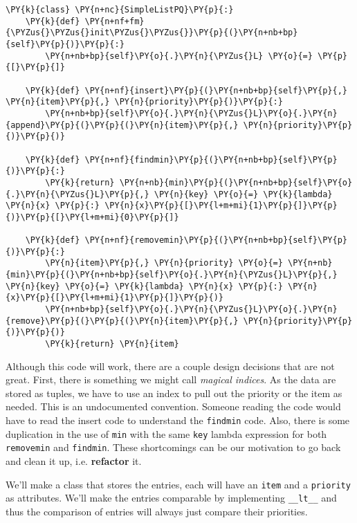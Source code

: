 \begin{Verbatim}[commandchars=\\\{\}]
\PY{k}{class} \PY{n+nc}{SimpleListPQ}\PY{p}{:}
    \PY{k}{def} \PY{n+nf+fm}{\PYZus{}\PYZus{}init\PYZus{}\PYZus{}}\PY{p}{(}\PY{n+nb+bp}{self}\PY{p}{)}\PY{p}{:}
        \PY{n+nb+bp}{self}\PY{o}{.}\PY{n}{\PYZus{}L} \PY{o}{=} \PY{p}{[}\PY{p}{]}

    \PY{k}{def} \PY{n+nf}{insert}\PY{p}{(}\PY{n+nb+bp}{self}\PY{p}{,} \PY{n}{item}\PY{p}{,} \PY{n}{priority}\PY{p}{)}\PY{p}{:}
        \PY{n+nb+bp}{self}\PY{o}{.}\PY{n}{\PYZus{}L}\PY{o}{.}\PY{n}{append}\PY{p}{(}\PY{p}{(}\PY{n}{item}\PY{p}{,} \PY{n}{priority}\PY{p}{)}\PY{p}{)}

    \PY{k}{def} \PY{n+nf}{findmin}\PY{p}{(}\PY{n+nb+bp}{self}\PY{p}{)}\PY{p}{:}
        \PY{k}{return} \PY{n+nb}{min}\PY{p}{(}\PY{n+nb+bp}{self}\PY{o}{.}\PY{n}{\PYZus{}L}\PY{p}{,} \PY{n}{key} \PY{o}{=} \PY{k}{lambda} \PY{n}{x} \PY{p}{:} \PY{n}{x}\PY{p}{[}\PY{l+m+mi}{1}\PY{p}{]}\PY{p}{)}\PY{p}{[}\PY{l+m+mi}{0}\PY{p}{]}

    \PY{k}{def} \PY{n+nf}{removemin}\PY{p}{(}\PY{n+nb+bp}{self}\PY{p}{)}\PY{p}{:}
        \PY{n}{item}\PY{p}{,} \PY{n}{priority} \PY{o}{=} \PY{n+nb}{min}\PY{p}{(}\PY{n+nb+bp}{self}\PY{o}{.}\PY{n}{\PYZus{}L}\PY{p}{,} \PY{n}{key} \PY{o}{=} \PY{k}{lambda} \PY{n}{x} \PY{p}{:} \PY{n}{x}\PY{p}{[}\PY{l+m+mi}{1}\PY{p}{]}\PY{p}{)}
        \PY{n+nb+bp}{self}\PY{o}{.}\PY{n}{\PYZus{}L}\PY{o}{.}\PY{n}{remove}\PY{p}{(}\PY{p}{(}\PY{n}{item}\PY{p}{,} \PY{n}{priority}\PY{p}{)}\PY{p}{)}
        \PY{k}{return} \PY{n}{item}
\end{Verbatim}



Although this code will work, there are a couple design decisions that are not great. First, there is something we might call \emph{magical indices}.
As the data are stored as tuples, we have to use an index to pull out the priority or the item as needed.  This is an undocumented convention.  Someone reading the code would have to read the insert code to understand the \texttt{findmin} code. Also, there is some duplication in the use of \texttt{min} with the same \texttt{key} lambda expression for both \texttt{removemin} and \texttt{findmin}. These shortcomings can be our motivation to go back and clean it up, i.e. \textbf{refactor} it.


We'll make a class that stores the entries, each will have an \texttt{item} and a \texttt{priority} as attributes. We'll make the entries comparable by implementing \texttt{\_\_lt\_\_} and thus the comparison of entries will always just compare their priorities.

